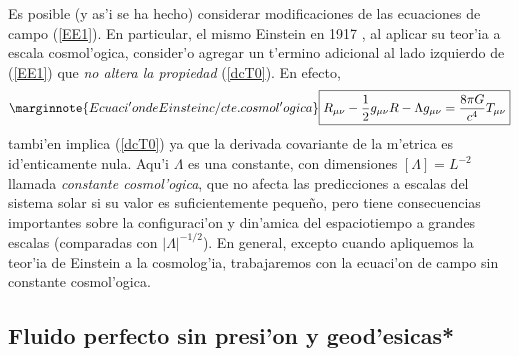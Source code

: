 Es posible (y as'i se ha hecho) considerar modificaciones de las ecuaciones de campo (\ref{EE1}). En particular, el mismo Einstein en 1917 \cite{Einstein17}, al aplicar su teor'ia a escala cosmol'ogica, consider'o agregar un t'ermino adicional al lado izquierdo de (\ref{EE1}) que \textit{no altera la propiedad} (\ref{dcT0}). En efecto,
\begin{equation}\marginnote{Ecuaci'on de Einstein c/cte. cosmol'ogica}
\boxed{R_{\mu\nu}-\frac{1}{2}g_{\mu\nu}R-\Lambda g_{\mu\nu}=\frac{8\pi
G}{c^4}T_{\mu\nu}}
\label{EE2}
\end{equation}
tambi'en implica (\ref{dcT0}) ya que la derivada covariante de la m'etrica es
id'enticamente nula. Aqu'i $\Lambda$ es una constante, con dimensiones
$[\Lambda]=L^{-2}$ llamada \textit{constante cosmol'ogica}, que no afecta las
predicciones a escalas del sistema solar si su valor es suficientemente peque\~no, pero tiene consecuencias importantes sobre la configuraci'on y din'amica del espaciotiempo a grandes escalas (comparadas con $|\Lambda|^{-1/2}$). En general, excepto cuando apliquemos la teor'ia de Einstein a la cosmolog'ia, trabajaremos con la ecuaci'on de campo sin constante cosmol'ogica.

\subsection{Fluido perfecto sin presi'on y geod'esicas*}\label{sec:FLG}

